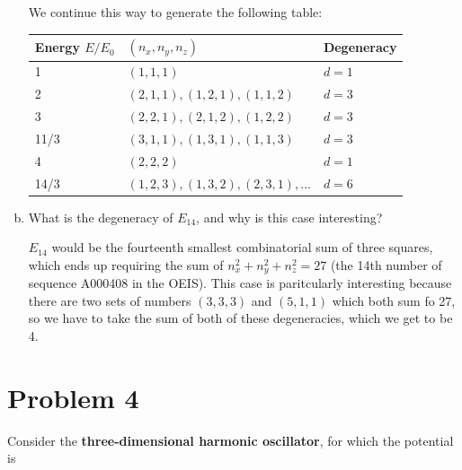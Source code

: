 \documentclass[10pt]{article}
\begin{document}
\begin{enumerate}[(a)]
\begin{solution}
            We continue this way to generate the following table: 

            \begin{center}
                \begin{tabular}{l|l|l}
                    Energy $E/E_0$ & $(n_x, n_y, n_z)$                        & Degeneracy \\ \hline
                    1              & $(1, 1, 1)$                              & $d = 1$    \\ \hline
                    2              & $(2, 1, 1), (1, 2, 1), (1, 1, 2)$        & $d = 3$    \\ \hline
                    3              & $(2, 2, 1), (2, 1, 2), (1, 2, 2)$        & $d = 3$    \\ \hline
                    11/3           & $(3, 1, 1), (1, 3, 1), (1, 1, 3)$        & $d = 3$    \\ \hline
                    4              & $(2, 2, 2)$                              & $d = 1$    \\ \hline
                    14/3           & $(1, 2, 3), (1, 3, 2), (2, 3, 1), \dots$ & $d = 6$   
                    \end{tabular}
            \end{center}
        \end{solution}
        \item What is the degeneracy of $E_{14}$, and why is this case interesting?
        
        \begin{solution}
            $E_{14}$ would be the fourteenth smallest combinatorial sum of three squares, which ends up requiring the sum of $n_x^2 + n_y^2 + n_z^2 = 27$ (the 14th number of sequence A000408 in the OEIS). This case is paritcularly interesting because there are two sets of numbers $(3, 3, 3)$ and $(5, 1, 1)$ which both sum fo 27, so we have to take the sum of both of these degeneracies, which we get to be 4.
        \end{solution}
    \end{enumerate}


    \pagebreak

    \section*{Problem 4}

    Consider the \textbf{three-dimensional harmonic oscillator}, for which the potential is
\end{document}
